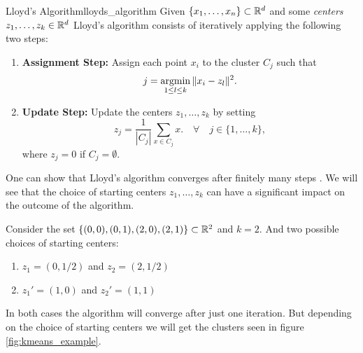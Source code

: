 \begin{definition}{Lloyd's Algorithm}{lloyds_algorithm}
Given $\{x_1, \dots, x_n\} \subset \mathbb R^d$ and some \emph{centers} $z_1, \dots, z_k \in \mathbb R^d$
Lloyd's algorithm consists of iteratively applying the following two steps:

\begin{enumerate}
    \item \textbf{Assignment Step:} Assign each point $x_i$ to the cluster $C_j$ such that
    $$
    j = \operatorname*{argmin}_{1 \leq l \leq k} \|x_i - z_l\|^2.
    $$

    \item \textbf{Update Step:} Update the centers $z_1, \dots, z_k$ by setting
    $$
    z_j = \frac{1}{|C_j|}\sum_{x \in C_j} x. \quad \forall \quad j \in \{1, \dots, k\},
    $$
    where $z_j = 0$ if $C_j = \emptyset$. 
\end{enumerate}
\end{definition}

One can show that Lloyd's algorithm converges after finitely many steps \cite[Thm.~3.14]{Scitovski2021}.
We will see that the choice of starting centers $z_1, \dots, z_k$ can have a significant impact on the outcome of the algorithm.

Consider the set $\{(0,0), (0,1), (2,0), (2,1)\} \subset \mathbb R^2$ and $k = 2$. And two possible choices of starting centers:

\begin{enumerate}
    \item $z_1 = (0, 1/2)$ and $z_2 = (2, 1/2)$
    \item $z_1' = (1, 0)$ and $z_2' = (1, 1)$
\end{enumerate}

In both cases the algorithm will converge after just one iteration. But depending on the choice of starting centers we will get the clusters seen in figure \ref{fig:kmeans_example}.



